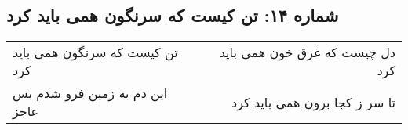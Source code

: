 \begin{center}
\section*{شماره ۱۴: تن کیست که سرنگون همی باید کرد}
\label{sec:014}
\begin{longtable}{l p{0.5cm} r}
تن کیست که سرنگون همی باید کرد
&&
دل چیست که غرق خون همی باید کرد
\\
این دم به زمین فرو شدم بس عاجز
&&
تا سر ز کجا برون همی باید کرد
\\
\end{longtable}
\end{center}
